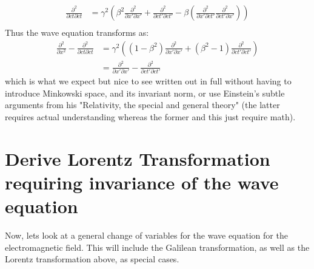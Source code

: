 %
\begin{equation}\label{eqn:lorentz:220}
\begin{aligned}
\frac{\partial^2}{\partial ct \partial ct}
&= \gamma^2
\left(
\beta^2 \frac{\partial^2}{\partial x'\partial x'} + \frac{\partial^2}{\partial c t'\partial c t'}
- \beta \left(
\frac{\partial^2}{\partial x' \partial c t'}
\frac{\partial^2}{\partial c t' \partial x'}
\right)
\right)
\\
\end{aligned}
\end{equation}
%
Thus the wave equation transforms as:
%
\begin{equation}\label{eqn:lorentz:240}
\begin{aligned}
\frac{\partial^2}{\partial x^2} - \frac{\partial^2}{\partial ct \partial ct}
&=
\gamma^2
\left(
(1 - \beta^2) \frac{\partial^2}{\partial x'\partial x'} + (\beta^2 -1)\frac{\partial^2}{\partial c t'\partial c t'}
\right) \\
&=
\frac{\partial^2}{\partial x'\partial x'} - \frac{\partial^2}{\partial c t'\partial c t'}
\end{aligned}
\end{equation}
%
which is what we expect but nice to see written out in full without having to introduce Minkowski space, and its invariant norm,
or use Einstein's subtle arguments from his "Relativity, the special and general theory" (the latter requires actual understanding
whereas the former and this just require math).

\section{Derive Lorentz Transformation requiring invariance of the wave equation}

Now, lets look at a general change of variables for the wave equation for the electromagnetic field.  This will include
the Galilean transformation, as well as the Lorentz transformation above, as special cases.

